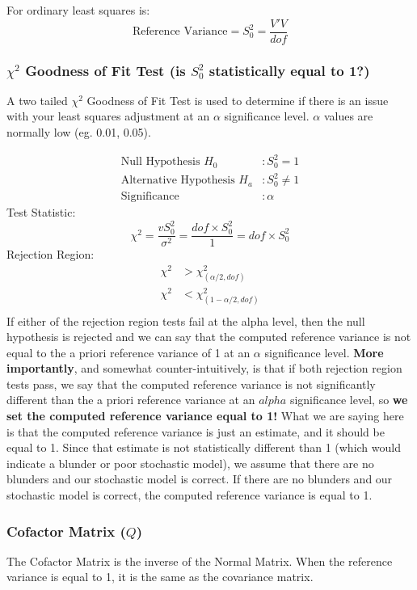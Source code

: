 For ordinary least squares is:
\[
\text{Reference Variance} = S_0^2 = \dfrac{V'V}{dof}
\]

\subsubsection*{$\chi^2$ Goodness of Fit Test (is $S_0^2$ statistically equal to 1?)}
A two tailed $\chi^2$ Goodness of Fit Test is used to determine if there is an issue with your least squares adjustment at an $\alpha$ significance level.  $\alpha$ values are normally low (eg. 0.01, 0.05).

\begin{align*}
\text{Null Hypothesis } H_0 &: S_0^2 = 1 \\
\text{Alternative Hypothesis } H_a &: S_0^2 \neq 1 \\
\text{Significance } &: \alpha
\end{align*}
Test Statistic:
\[
\chi^2 = \dfrac{vS_0^2}{\sigma^2} = \dfrac{dof\times S_0^2}{1} = dof\times S_0^2
\]
Rejection Region:
\begin{align*}
\chi^2 &> \chi_{(\alpha/2,dof)}^2 \\
\chi^2 &< \chi_{(1-\alpha/2,dof)}^2 \\
\end{align*}
If either of the rejection region tests fail at the alpha level, then the null hypothesis is rejected and we can say that the computed reference variance is not equal to the a priori reference variance of 1 at an $\alpha$ significance level.  \textbf{More importantly}, and somewhat counter-intuitively, is that if both rejection region tests pass, we say that the computed reference variance is not significantly different than the a priori reference variance at an $alpha$ significance level, so \textbf{we set the computed reference variance equal to 1!}  What we are saying here is that the computed reference variance is just an estimate, and it should be equal to 1.  Since that estimate is not statistically different than 1 (which would indicate a blunder or poor stochastic model), we assume that there are no blunders and our stochastic model is correct.  If there are no blunders and our stochastic model is correct, the computed reference variance is equal to 1.
\subsubsection*{Cofactor Matrix ($Q$)}
The Cofactor Matrix is the inverse of the Normal Matrix.  When the reference variance is equal to 1, it is the same as the covariance matrix.  

